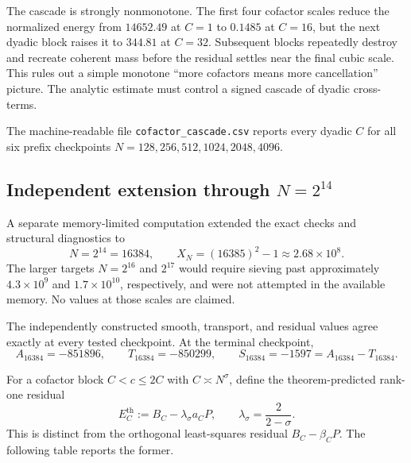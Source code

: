 \documentclass[11pt]{article}
\theoremstyle{definition}
\newcommand{\1}{\mathbf{1}}
\begin{document}
The cascade is strongly nonmonotone.  The first four cofactor scales reduce the normalized energy from $14652.49$ at $C=1$ to $0.1485$ at $C=16$, but the next dyadic block raises it to $344.81$ at $C=32$. Subsequent blocks repeatedly destroy and recreate coherent mass before the residual settles near the final cubic scale.  This rules out a simple monotone ``more cofactors means more cancellation'' picture. The analytic estimate must control a signed cascade of dyadic cross-terms.

The machine-readable file \texttt{cofactor\_cascade.csv} reports every dyadic $C$ for all six prefix checkpoints $N=128,256,512,1024,2048,4096$.

\subsection{Independent extension through $N=2^{14}$}
\label{subsec:numerics-16384}

A separate memory-limited computation extended the exact checks and structural diagnostics to
\begin{equation}
 N=2^{14}=16384,
 \qquad
 X_N=(16385)^2-1\approx2.68\times10^8.
 \label{eq:extended-range-16384}
\end{equation}
The larger targets $N=2^{16}$ and $2^{17}$ would require sieving past approximately $4.3\times10^9$ and $1.7\times10^{10}$, respectively, and were not attempted in the available memory.  No values at those scales are claimed.

The independently constructed smooth, transport, and residual values agree exactly at every tested checkpoint.  At the terminal checkpoint,
\begin{equation}
 \boxed{
 A_{16384}=-851896,
 \qquad
 T_{16384}=-850299,
 \qquad
 S_{16384}=-1597=A_{16384}-T_{16384}.
 }
 \label{eq:extended-terminal-identity}
\end{equation}

For a cofactor block $C<c\le2C$ with $C\asymp N^\sigma$, define the theorem-predicted rank-one residual
\begin{equation}
 E_C^{\mathrm{th}}
 :=B_C-\lambda_\sigma a_C P,
 \qquad
 \lambda_\sigma=\frac{2}{2-\sigma}.
 \label{eq:theorem-predicted-residual}
\end{equation}
This is distinct from the orthogonal least-squares residual $B_C-\widehat\beta_CP$.  The following table reports the former.
\end{document}
